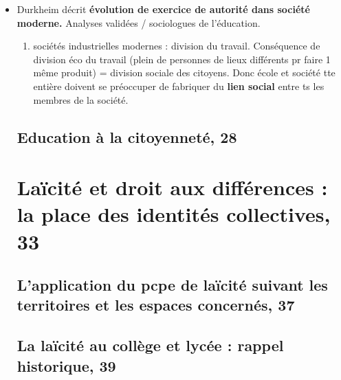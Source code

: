 \documentclass[12pt]{report}
\begin{document}
\begin{itemize}
\item Durkheim décrit \textbf{évolution de exercice de autorité dans société moderne.} Analyses validées / sociologues de l'éducation. \\
\begin{enumerate}
\item sociétés industrielles modernes :  division du travail. Conséquence de division éco du travail (plein de personnes de lieux différents pr faire 1 même produit) = division sociale des citoyens. Donc école et société tte entière doivent se préoccuper de fabriquer du \textbf{lien social} entre ts les membres de la société.
\end{enumerate}


\section{Education à la citoyenneté, 28}


\chapter{Laïcité et droit aux différences : la place des identités collectives, 33}

\section{L'application du pcpe de laïcité suivant les territoires et les espaces concernés, 37}

\section{La laïcité au collège et lycée : rappel historique, 39}


\end{itemize}
\end{document}
